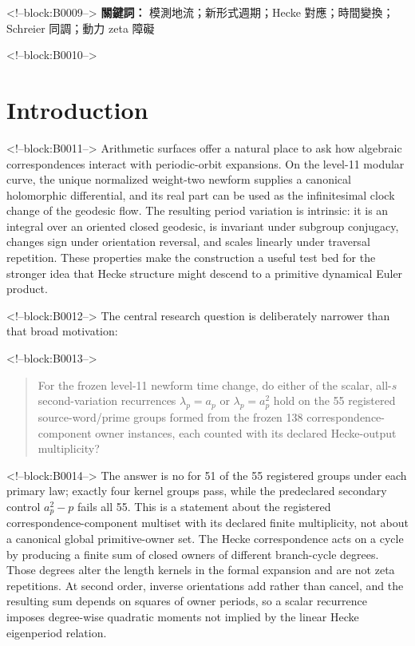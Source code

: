 \documentclass[11pt]{article}
\theoremstyle{definition}
\theoremstyle{remark}
\begin{document}
<!--block:B0009-->
\medskip
\noindent\textbf{關鍵詞：} 模測地流；新形式週期；Hecke 對應；時間變換；Schreier 同調；動力 zeta 障礙

<!--block:B0010-->
\section{Introduction}

<!--block:B0011-->
Arithmetic surfaces offer a natural place to ask how algebraic correspondences interact with periodic-orbit expansions. On the level-11 modular curve, the unique normalized weight-two newform supplies a canonical holomorphic differential, and its real part can be used as the infinitesimal clock change of the geodesic flow. The resulting period variation is intrinsic: it is an integral over an oriented closed geodesic, is invariant under subgroup conjugacy, changes sign under orientation reversal, and scales linearly under traversal repetition. These properties make the construction a useful test bed for the stronger idea that Hecke structure might descend to a primitive dynamical Euler product.

<!--block:B0012-->
The central research question is deliberately narrower than that broad motivation:

<!--block:B0013-->
\begin{quote}
For the frozen level-11 newform time change, do either of the scalar, all-$s$ second-variation recurrences $\lambda_p=a_p$ or $\lambda_p=a_p^2$ hold on the 55 registered source-word/prime groups formed from the frozen 138 correspondence-component owner instances, each counted with its declared Hecke-output multiplicity?
\end{quote}

<!--block:B0014-->
The answer is no for 51 of the 55 registered groups under each primary law; exactly four kernel groups pass, while the predeclared secondary control $a_p^2-p$ fails all 55. This is a statement about the registered correspondence-component multiset with its declared finite multiplicity, not about a canonical global primitive-owner set. The Hecke correspondence acts on a cycle by producing a finite sum of closed owners of different branch-cycle degrees. Those degrees alter the length kernels in the formal expansion and are not zeta repetitions. At second order, inverse orientations add rather than cancel, and the resulting sum depends on squares of owner periods, so a scalar recurrence imposes degree-wise quadratic moments not implied by the linear Hecke eigenperiod relation.
\end{document}
